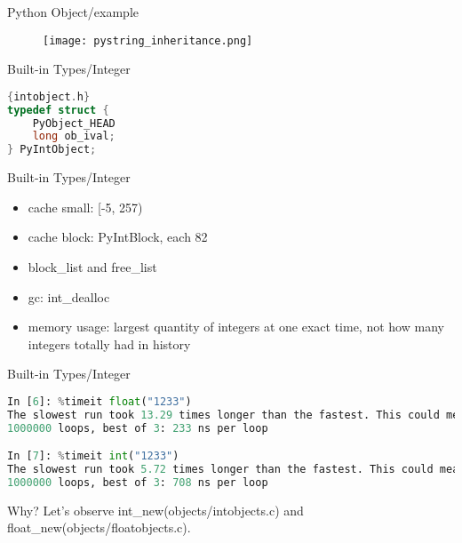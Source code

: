 \documentclass[xcolor=svgnames]{beamer}
\begin{document}
\begin{frame}[fragile]{Python Object/example}
    \begin{figure}
       \begin{center}
       \texttt{[image: pystring\_inheritance.png]}
       \end{center}
\end{figure}
\end{frame}

\begin{frame}[fragile]{Built-in Types/Integer}
\begin{lstlisting}[language=C]{intobject.h}
typedef struct {
    PyObject_HEAD
    long ob_ival;
} PyIntObject;
\end{lstlisting} 
\end{frame}

\begin{frame}{Built-in Types/Integer}
\begin{itemize} 
    \item cache small: [-5, 257)
  \item cache block: PyIntBlock, each 82
  \item block\_list and free\_list
  \item gc: int\_dealloc
  \item memory usage: largest quantity of integers at one exact time, not how many integers totally had in history
\end{itemize}
\end{frame}

\begin{frame}[fragile]{Built-in Types/Integer}
\begin{lstlisting}[language=Python]
In [6]: %timeit float("1233")
The slowest run took 13.29 times longer than the fastest. This could mean that an intermediate result is being cached
1000000 loops, best of 3: 233 ns per loop

In [7]: %timeit int("1233")
The slowest run took 5.72 times longer than the fastest. This could mean that an intermediate result is being cached
1000000 loops, best of 3: 708 ns per loop
\end{lstlisting} 
Why?
Let's observe int\_new(objects/intobjects.c) and float\_new(objects/floatobjects.c).
\end{frame}
\end{document}

